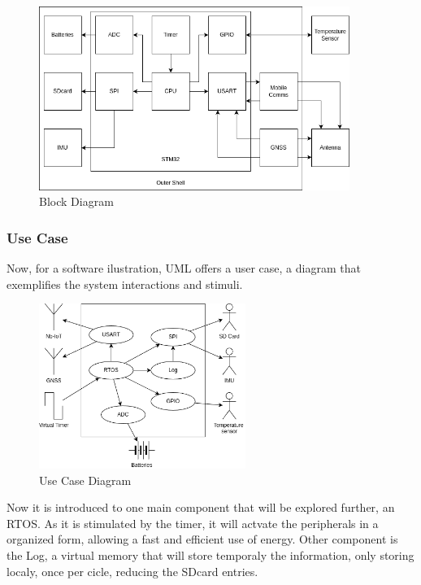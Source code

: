 \begin{figure}[H]
    \centering
    \includegraphics[width=0.9\textwidth]{images/diagrams/block_diagram/block_diagrams_3/blockdiagram_analysis.drawio.png}  %
    \caption{Block Diagram}
    \label{fig:Block Diagram}        
\end{figure}

\subsubsection{Use Case}

Now, for a software ilustration, UML offers a user case, a diagram that exemplifies the system interactions and stimuli.

\begin{figure}[H]
    \centering
    \includegraphics[width=0.6\textwidth]{images/diagrams/use_case/Use Case.drawio.png}  %
    \caption{Use Case Diagram}
    \label{fig:Use Case Diagram}        
\end{figure}

Now it is introduced to one main component that will be explored further, an RTOS. As it is stimulated by the timer, it will actvate the 
peripherals in a organized form, allowing a fast and efficient use of energy. Other component is the Log, a virtual memory that will store
temporaly the information, only storing localy, once per cicle, reducing the SDcard entries.

